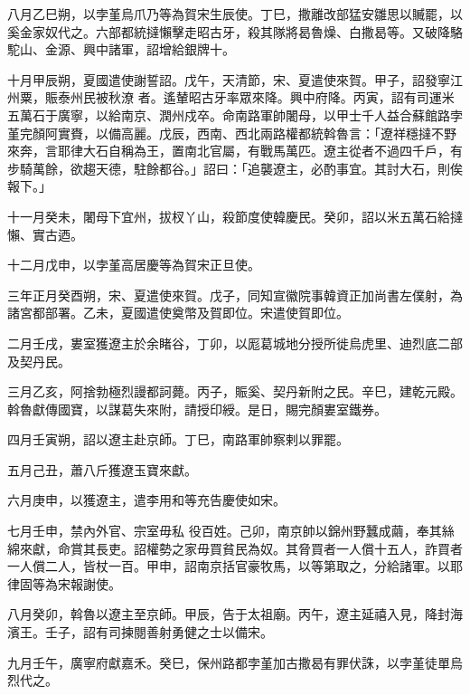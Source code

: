 \begin{pinyinscope}
 八月乙巳朔，以孛堇烏爪乃等為賀宋生辰使。丁巳，撒離改部猛安雛思以贓罷，以奚金家奴代之。六部都統撻懶擊走昭古牙，殺其隊將曷魯燥、白撒曷等。又破降駱駝山、金源、興中諸軍，詔增給銀牌十。



 十月甲辰朔，夏國遣使謝誓詔。戊午，天清節，宋、夏遣使來賀。甲子，詔發寧江州粟，賑泰州民被秋潦
 者。遙輦昭古牙率眾來降。興中府降。丙寅，詔有司運米五萬石于廣寧，以給南京、潤州戍卒。命南路軍帥闍母，以甲士千人益合蘇館路孛堇完顏阿實賚，以備高麗。戊辰，西南、西北兩路權都統斡魯言：「遼祥穩撻不野來奔，言耶律大石自稱為王，置南北官屬，有戰馬萬匹。遼主從者不過四千戶，有步騎萬餘，欲趨天德，駐餘都谷。」詔曰：「追襲遼主，必酌事宜。其討大石，則俟報下。」



 十一月癸未，闍母下宜州，拔杈丫山，殺節度使韓慶民。癸卯，詔以米五萬石給撻懶、實古迺。



 十二月戊申，以孛堇高居慶等為賀宋正旦使。



 三年正月癸酉朔，宋、夏遣使來賀。戊子，同知宣徽院事韓資正加尚書左僕射，為諸宮都部署。乙未，夏國遣使奠幣及賀即位。宋遣使賀即位。



 二月壬戌，婁室獲遼主於余睹谷，丁卯，以厖葛城地分授所徙烏虎里、迪烈底二部及契丹民。



 三月乙亥，阿捨勃極烈謾都訶薨。丙子，賑奚、契丹新附之民。辛巳，建乾元殿。斡魯獻傳國寶，以謀葛失來附，請授印綬。是日，賜完顏婁室鐵券。



 四月壬寅朔，詔以遼主赴京師。丁巳，南路軍帥察剌以罪罷。



 五月己丑，蕭八斤獲遼玉寶來獻。



 六月庚申，以獲遼主，遣李用和等充告慶使如宋。



 七月壬申，禁內外官、宗室毋私
 役百姓。己卯，南京帥以錦州野蠶成繭，奉其絲綿來獻，命賞其長吏。詔權勢之家毋買貧民為奴。其脅買者一人償十五人，詐買者一人償二人，皆杖一百。甲申，詔南京括官豪牧馬，以等第取之，分給諸軍。以耶律固等為宋報謝使。



 八月癸卯，斡魯以遼主至京師。甲辰，告于太祖廟。丙午，遼主延禧入見，降封海濱王。壬子，詔有司揀閱善射勇健之士以備宋。



 九月壬午，廣寧府獻嘉禾。癸巳，保州路都孛堇加古撒曷有罪伏誅，以孛堇徒單烏烈代之。




\end{pinyinscope}
